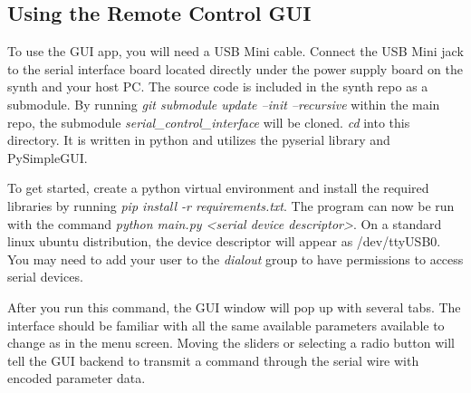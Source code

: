 \documentclass[acmlarge,screen]{acmart}
\begin{document}
\subsection{Using the Remote Control GUI} To use the GUI app, you will need a USB Mini cable. Connect the USB Mini jack to the serial interface board located directly under the power supply board on the synth and your host PC. The source code is included in the synth repo as a submodule. By running \textit{git submodule update --init --recursive} within the main repo, the submodule \textit{serial\_control\_interface} will be cloned. \textit{cd} into this directory. It is written in python and utilizes the pyserial library and PySimpleGUI.

To get started, create a python virtual environment and install the required libraries by running \textit{pip install -r requirements.txt}. The program can now be run with the command \textit{python main.py <serial device descriptor>}. On a standard linux ubuntu distribution, the device descriptor will appear as /dev/ttyUSB0. You may need to add your user to the \textit{dialout} group to have permissions to access serial devices.

After you run this command, the GUI window will pop up with several tabs. The interface should be familiar with all the same available parameters available to change as in the menu screen. Moving the sliders or selecting a radio button will tell the GUI backend to transmit a command through the serial wire with encoded parameter data.
\end{document}
